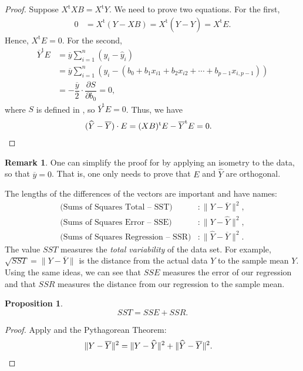 \documentclass[a4paper, 12pt]{article}
\numberwithin{equation}{section}
\numberwithin{figure}{section}
\newtheorem{prop}[thm]{Proposition}
\theoremstyle{definition}
\newtheorem{remark}[thm]{Remark}
\newcommand{\tr}{\mathrm{t}}
\begin{document}
\begin{proof}
	Suppose $X^{\tr}XB = X^{\tr}Y$. We need to prove two equations. For the
	first, 
	\begin{align*}
		0 &= X^{\tr}(Y - XB) = X^{\tr}(Y - \widehat{Y}) = X^{\tr}E.
	\end{align*}
	Hence, $X^{\tr}E=0$. For the second, 
	\begin{align*}
		\overline{Y}^{\tr}E &= \overline{y} \sum_{i=1}^n (y_i - \widehat{y}_i) \\
		&= \overline{y} \sum_{i=1}^n (y_i - (b_0+b_1x_{i1} + b_2x_{i2} + \cdots + b_{p-1}x_{i,p-1})) \\
		&= -\dfrac{\overline{y}}{2} \cdot \dfrac{\partial S}{\partial b_0} = 0,
	\end{align*}
	where $S$ is defined in , so $\overline{Y}^{\tr}E=0$.
	Thus, we have 
	\begin{align*}
		(\widehat{Y} - \overline{Y}) \cdot E &= (XB)^{\tr} E - \overline{Y}^{\tr}E = 0. \qedhere
	\end{align*}
\end{proof}

\begin{remark}
	One can simplify the proof for  by applying an isometry to
	the data, so that $\overline{y} = 0$. That is, one only needs to prove that
	$E$ and $\widehat{Y}$ are orthogonal.
\end{remark}

The lengths of the differences of the vectors are important and have names: 
\begin{align*} 
	\text{(Sums of Squares Total -- SST)} &: \|Y - \overline{Y} \|^2, \\
	\text{(Sums of Squares Error -- SSE)} &: \| Y - \widehat{Y}\|^2, \\
	\text{(Sums of Squares Regression -- SSR)} &: \| \widehat{Y} - \overline{Y}\|^2 .
\end{align*} 
The value $SST$ measures the \textit{total variability} of the data set. For
example, $\sqrt{SST} = \| Y - \overline{Y} \|$ is the distance from the actual
data $Y$ to the sample mean $Y$. Using the same ideas, we can see that $SSE$
measures the error of our regression and that $SSR$ measures the distance from
our regression to the sample mean. 

\begin{prop}\label{prop:SS-values}
	\[ 
		SST = SSE + SSR. 
	\] 
\end{prop}

\begin{proof}
	Apply  and the Pythagorean Theorem:
	\begin{align*} 
		\| Y - \overline{Y} \|^2 &= \| Y - \widehat{Y}\|^2 + \| \widehat{Y} - \overline{Y} \|^2.  \qedhere
	\end{align*} 
\end{proof}
\end{document}
